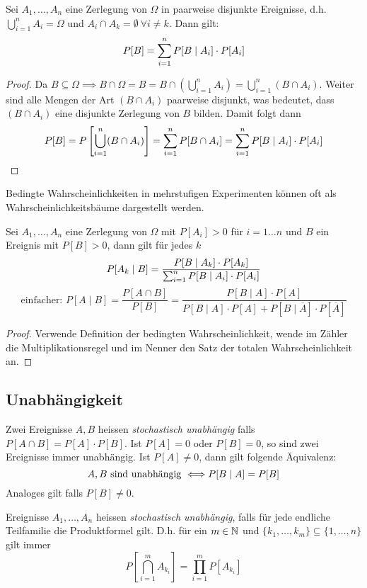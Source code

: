 \begin{satz}
Sei $A_1,\dots,A_n$ eine Zerlegung von $\Omega$ in paarweise disjunkte Ereignisse, d.h. $\bigcup_{i=1}^n A_i = \Omega$ und $A_i \cap A_k = \emptyset \: \forall i\neq k$. Dann gilt:
$$ P[B] = \sum_{i=1}^n P[B \;|\; A_i] \cdot P[A_i]$$
\end{satz}
\begin{proof}
Da $B\subseteq \Omega \implies B \cap \Omega = B = B \cap \left( \bigcup_{i=1}^n A_i \right) = \bigcup_{i=1}^n \left(B \cap A_i \right)$. Weiter sind alle Mengen der Art $(B \cap A_i)$ paarweise disjunkt, was bedeutet, dass $(B\cap A_i)$ eine disjunkte Zerlegung von $B$ bilden. Damit folgt dann 
$$ P[B] = P\left[ \bigcup_{i=1}^n (B \cap A_i) \right] = \sum_{i=1}^n P[B \cap A_i] = \sum_{i=1}^n P[B \;|\; A_i] \cdot P[A_i]$$
\end{proof}
Bedingte Wahrscheinlichkeiten in mehrstufigen Experimenten können oft als Wahrscheinlichkeitsbäume dargestellt werden.

\begin{satz}
Sei $A_1,\dots,A_n$ eine Zerlegung von $\Omega$ mit $P[A_i] > 0$ für $i = 1 \dots n$ und $B$ ein Ereignis mit $P[B] > 0$, dann gilt für jedes $k$
$$ P[A_k \;|\; B] = \frac{P[B \;|\; A_k]\cdot P[A_k]}{\sum_{i=1}^n P[B \;|\; A_i] \cdot P[A_i]}$$
\[
	\text{einfacher: } P[A\mid B] =
	\frac{P[A \cap B]}{P[B]} =
	\frac{P[B\mid A]\cdot P[A]}{P[B\mid A]\cdot P[A] + P[B \mid \overline{A}]\cdot P[\overline{A}]}
\]
\end{satz}
\begin{proof}
Verwende Definition der bedingten Wahrscheinlichkeit, wende im Zähler die Multiplikationsregel und im Nenner den Satz der totalen Wahrscheinlichkeit an.
\end{proof}

\subsection{Unabhängigkeit}
\begin{definition}
Zwei Ereignisse $A,B$ heissen \textit{stochastisch unabhängig} falls $P[A \cap B] = P[A] \cdot P[B]$. Ist $P[A]=0$ oder $P[B] = 0$, so sind zwei Ereignisse immer unabhängig. Ist $P[A]\neq 0$, dann gilt folgende Äquivalenz:
$$ A, B \mbox{ sind unabhängig } \Longleftrightarrow P[B \;|\; A] = P[B]$$
Analoges gilt falls $P[B] \neq 0$.
\end{definition}

\begin{definition}
Ereignisse $A_1,\dots,A_n$ heissen \textit{stochastisch unabhängig}, falls für jede endliche Teilfamilie die Produktformel gilt. D.h. für ein $m \in \mathbb{N}$ und $\{k_1,\dots, k_m\} \subseteq \{1, \dots, n\}$ gilt immer
$$ P \left[ \bigcap_{i=1}^m A_{k_i} \right] = \prod_{i=1}^m P[A_{k_i}]$$
\end{definition}


	





	
	
	
	